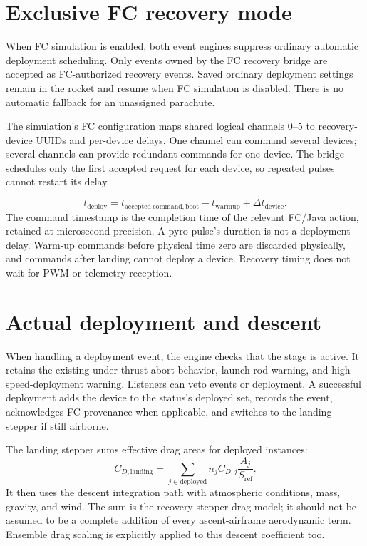 

\section{Exclusive FC recovery mode}
When FC simulation is enabled, both event engines suppress ordinary automatic deployment scheduling. Only events owned by the FC recovery bridge are accepted as FC-authorized recovery events. Saved ordinary deployment settings remain in the rocket and resume when FC simulation is disabled. There is no automatic fallback for an unassigned parachute.

The simulation's FC configuration maps shared logical channels 0--5 to recovery-device UUIDs and per-device delays. One channel can command several devices; several channels can provide redundant commands for one device. The bridge schedules only the first accepted request for each device, so repeated pulses cannot restart its delay.

\begin{equation}
 t_{\mathrm{deploy}}=t_{\mathrm{accepted\ command,boot}}-t_{\mathrm{warmup}}+\Delta t_{\mathrm{device}}.
\end{equation}
The command timestamp is the completion time of the relevant FC/Java action, retained at microsecond precision. A pyro pulse's duration is not a deployment delay. Warm-up commands before physical time zero are discarded physically, and commands after landing cannot deploy a device. Recovery timing does not wait for PWM or telemetry reception.

\section{Actual deployment and descent}
When handling a deployment event, the engine checks that the stage is active. It retains the existing under-thrust abort behavior, launch-rod warning, and high-speed-deployment warning. Listeners can veto events or deployment. A successful deployment adds the device to the status's deployed set, records the event, acknowledges FC provenance when applicable, and switches to the landing stepper if still airborne.

The landing stepper sums effective drag areas for deployed instances:
\begin{equation}
 C_{D,\mathrm{landing}}=\sum_{j\in\mathrm{deployed}}
 n_j C_{D,j}\frac{A_j}{S_{\mathrm{ref}}}.
\end{equation}
It then uses the descent integration path with atmospheric conditions, mass, gravity, and wind. The sum is the recovery-stepper drag model; it should not be assumed to be a complete addition of every ascent-airframe aerodynamic term. Ensemble drag scaling is explicitly applied to this descent coefficient too.

